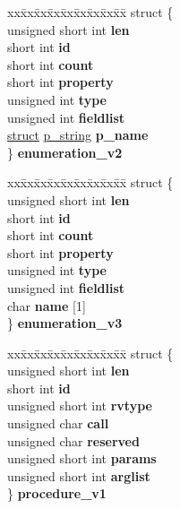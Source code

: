 \begin{DoxyCompactItemize}
\begin{tabbing}
\end{tabbing}\item 
\mbox{\label{unioncodeview__type_a51a1c8fa2fdd00b899b1373da1f26d6e}} 
\begin{tabbing}
xx\=xx\=xx\=xx\=xx\=xx\=xx\=xx\=xx\=\kill
struct \{\\
\>unsigned short int {\bfseries len}\\
\>short int {\bfseries id}\\
\>short int {\bfseries count}\\
\>short int {\bfseries property}\\
\>unsigned int {\bfseries type}\\
\>unsigned int {\bfseries fieldlist}\\
\>\hyperlink{interfacestruct}{struct} \hyperlink{structp__string}{p\_string} {\bfseries p\_name}\\
\} {\bfseries enumeration\_v2}\\

\end{tabbing}\item 
\mbox{\label{unioncodeview__type_a51b3f5866787b8565f41a5ae4d822f96}} 
\begin{tabbing}
xx\=xx\=xx\=xx\=xx\=xx\=xx\=xx\=xx\=\kill
struct \{\\
\>unsigned short int {\bfseries len}\\
\>short int {\bfseries id}\\
\>short int {\bfseries count}\\
\>short int {\bfseries property}\\
\>unsigned int {\bfseries type}\\
\>unsigned int {\bfseries fieldlist}\\
\>char {\bfseries name} \mbox{[}1\mbox{]}\\
\} {\bfseries enumeration\_v3}\\

\end{tabbing}\item 
\mbox{\label{unioncodeview__type_a7f504a024b1155591bb4a1e76f7d907a}} 
\begin{tabbing}
xx\=xx\=xx\=xx\=xx\=xx\=xx\=xx\=xx\=\kill
struct \{\\
\>unsigned short int {\bfseries len}\\
\>short int {\bfseries id}\\
\>unsigned short int {\bfseries rvtype}\\
\>unsigned char {\bfseries call}\\
\>unsigned char {\bfseries reserved}\\
\>unsigned short int {\bfseries params}\\
\>unsigned short int {\bfseries arglist}\\
\} {\bfseries procedure\_v1}\\


\end{tabbing}
\end{DoxyCompactItemize}
